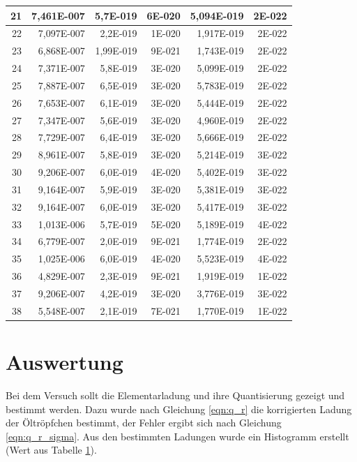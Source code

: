 \documentclass[12pt]{scrartcl}
\begin{document}
\begin{table}[H]
\begin{center}
\begin{tabular}{|r|r|r|r|r|r|}
21 & 7,461E-007 & 5,7E-019 & 6E-020 & 5,094E-019 & 2E-022 \\ \hline
22 & 7,097E-007 & 2,2E-019 & 1E-020 & 1,917E-019 & 2E-022 \\ \hline
23 & 6,868E-007 & 1,99E-019 & 9E-021 & 1,743E-019 & 2E-022 \\ \hline
24 & 7,371E-007 & 5,8E-019 & 3E-020 & 5,099E-019 & 2E-022 \\ \hline
25 & 7,887E-007 & 6,5E-019 & 3E-020 & 5,783E-019 & 2E-022 \\ \hline
26 & 7,653E-007 & 6,1E-019 & 3E-020 & 5,444E-019 & 2E-022 \\ \hline
27 & 7,347E-007 & 5,6E-019 & 3E-020 & 4,960E-019 & 2E-022 \\ \hline
28 & 7,729E-007 & 6,4E-019 & 3E-020 & 5,666E-019 & 2E-022 \\ \hline
29 & 8,961E-007 & 5,8E-019 & 3E-020 & 5,214E-019 & 3E-022 \\ \hline
30 & 9,206E-007 & 6,0E-019 & 4E-020 & 5,402E-019 & 3E-022 \\ \hline
31 & 9,164E-007 & 5,9E-019 & 3E-020 & 5,381E-019 & 3E-022 \\ \hline
32 & 9,164E-007 & 6,0E-019 & 3E-020 & 5,417E-019 & 3E-022 \\ \hline
33 & 1,013E-006 & 5,7E-019 & 5E-020 & 5,189E-019 & 4E-022 \\ \hline
34 & 6,779E-007 & 2,0E-019 & 9E-021 & 1,774E-019 & 2E-022 \\ \hline
35 & 1,025E-006 & 6,0E-019 & 4E-020 & 5,523E-019 & 4E-022 \\ \hline
36 & 4,829E-007 & 2,3E-019 & 9E-021 & 1,919E-019 & 1E-022 \\ \hline
37 & 9,206E-007 & 4,2E-019 & 3E-020 & 3,776E-019 & 3E-022 \\ \hline
38 & 5,548E-007 & 2,1E-019 & 7E-021 & 1,770E-019 & 1E-022 \\ \hline
\end{tabular}
\end{center}
\label{tab:messwerte_3}
\end{table}


\section{Auswertung}
Bei dem Versuch sollt die Elementarladung und ihre Quantisierung gezeigt und bestimmt werden. Dazu wurde nach Gleichung \ref{eqn:q_r} die korrigierten Ladung der Öltröpfchen bestimmt, der Fehler ergibt sich nach Gleichung \ref{eqn:q_r_sigma}. Aus den bestimmten Ladungen wurde ein Histogramm erstellt (Wert aus Tabelle \ref{tab:messwerte_3}).
\end{document}
